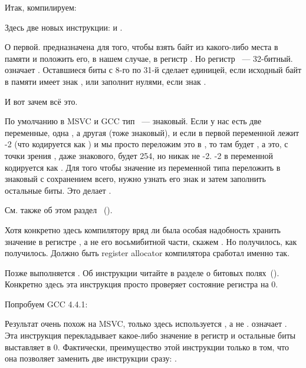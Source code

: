 

Итак, компилируем:



Здесь две новых инструкции: \MOVSX и \TEST.

\label{MOVSX}
О первой. \MOVSX предназначена для того, чтобы взять байт из какого-либо места в памяти и положить его, 
в нашем случае, в регистр \EDX. 
Но регистр \EDX~--- 32-битный. \MOVSX означает . 
Оставшиеся биты с 8-го по 31-й \MOVSX сделает единицей, если исходный байт в памяти имеет знак , 
или заполнит нулями, если знак .

И вот зачем всё это.

По умолчанию в MSVC и GCC тип \Tchar~--- знаковый. Если у нас есть две переменные, одна \Tchar, а другая \Tint 
(\Tint тоже знаковый), и если в первой переменной лежит -2 (что кодируется как ) и мы просто 
переложим это в \Tint, 
то там будет , а это, с точки зрения \Tint, даже знакового, будет 254, но никак не -2. 
-2 в переменной \Tint кодируется как . Для того чтобы значение  из переменной типа 
\Tchar переложить 
в знаковый \Tint с сохранением всего, нужно узнать его знак и затем заполнить остальные биты. 
Это делает \MOVSX.

См. также об этом раздел
 \q{\IT{\SignedNumbersSectionName}}~().

Хотя конкретно здесь компилятору вряд ли была особая надобность хранить значение \Tchar в регистре \EDX, 
а не его восьмибитной части, скажем \DL. Но получилось, как получилось. Должно быть 
\gls{register allocator} компилятора сработал именно так.

Позже выполняется . 
Об инструкции \TEST читайте в разделе о битовых полях~().
Конкретно здесь эта инструкция просто проверяет состояние регистра \EDX на 0.


Попробуем GCC 4.4.1:



\label{movzx}
Результат очень похож на MSVC, только здесь используется \MOVZX, а не \MOVSX. 
\MOVZX означает . Эта инструкция перекладывает какое-либо значение 
в регистр и остальные биты выставляет в 0.
Фактически, преимущество этой инструкции только в том, что она позволяет 
заменить две инструкции сразу: .

